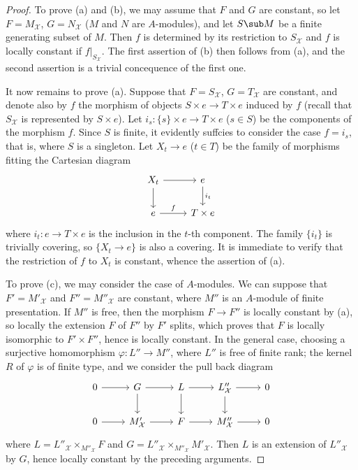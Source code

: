 \begin{proof}
To prove (a) and (b), we may assume that $F$ and $G$ are constant, so let $F=M_\mathcal{X}$, $G=N_\mathcal{X}$ ($M$ and $N$ are $A$-modules), and let $S\sub M$ be a finite generating subset of $M$. Then $f$ is determined by its restriction to $S_\mathcal{X}$ and $f$ is locally constant if $f|_{S_\mathcal{X}}$. The first assertion of (b) then follows from (a), and the second assertion is a trivial concequence of the first one.\par
It now remains to prove (a). Suppose that $F=S_\mathcal{X}$, $G=T_\mathcal{X}$ are constant, and denote also by $f$ the morphism of objects $S\times e\to T\times e$ induced by $f$ (recall that $S_\mathcal{X}$ is represented by $S\times e$). Let $i_s:\{s\}\times e\to T\times e$ ($s\in S$) be the components of the morphism $f$. Since $S$ is finite, it evidently suffcies to consider the case $f=i_s$, that is, where $S$ is a singleton. Let $X_t\to e$ ($t\in T$) be the family of morphisms fitting the Cartesian diagram
\[\begin{tikzcd}
X_t\ar[r]\ar[d]&e\ar[d,"i_t"]\\
e\ar[r,"f"]&T\times e
\end{tikzcd}\]
where $i_t:e\to T\times e$ is the inclusion in the $t$-th component. The family $\{i_t\}$ is trivially covering, so $\{X_t\to e\}$ is also a covering. It is immediate to verify that the restriction of $f$ to $X_t$ is constant, whence the assertion of (a).\par
To prove (c), we may consider the case of $A$-modules. We can suppose that $F'=M'_\mathcal{X}$ and $F''=M''_\mathcal{X}$ are constant, where $M''$ is an $A$-module of finite presentation. If $M''$ is free, then the morphism $F\to F''$ is locally constant by (a), so locally the extension $F$ of $F''$ by $F'$ splits, which proves that $F$ is locally isomorphic to $F'\times F''$, hence is locally constant. In the general case, choosing a surjective homomorphism $\varphi:L''\to M''$, where $L''$ is free of finite rank; the kernel $R$ of $\varphi$ is of finite type, and we consider the pull back diagram
\[\begin{tikzcd}
0\ar[r]&G\ar[r]\ar[d]&L\ar[r]\ar[d]&L''_\mathcal{X}\ar[d]\ar[r]&0\\
0\ar[r]&M'_\mathcal{X}\ar[r]&F\ar[r]&M''_\mathcal{X}\ar[r]&0
\end{tikzcd}\]
where $L=L''_\mathcal{X}\times_{M''_\mathcal{X}}F$ and $G=L''_\mathcal{X}\times_{M''_\mathcal{X}}M'_\mathcal{X}$. Then $L$ is an extension of $L''_\mathcal{X}$ by $G$, hence locally constant by the preceding arguments.
\end{proof}

